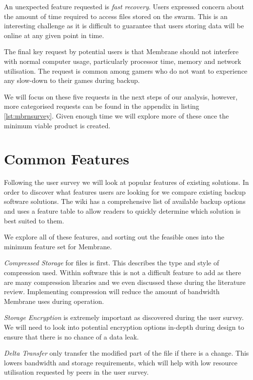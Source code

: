 \documentclass[11pt, a4paper, twoside]{report}
\begin{document}
An unexpected feature requested is \emph{fast recovery}. Users expressed concern about the amount of time required to access files stored on the swarm. This is an interesting challenge as it is difficult to guarantee that users storing data will be online at any given point in time.

The final key request by potential users is that Membrane should not interfere with normal computer usage, particularly processor time, memory and network utilisation. The request is common among gamers who do not want to experience any slow-down to their games during backup.

We will focus on these five requests in the next steps of our analysis, however, more categorised requests can be found in the appendix in listing \ref{lst:mbrnsurvey}. Given enough time we will explore more of these once the minimum viable product is created.

\section{Common Features} \label{sec:commonfeatures}

Following the user survey we will look at popular features of existing solutions. In order to discover what features users are looking for we compare existing backup software solutions. The \cite{arch2017syncandbackup} wiki has a comprehensive list of available backup options and uses a feature table to allow readers to quickly determine which solution is best suited to them.

We explore all of these features, and sorting out the feasible ones into the minimum feature set for Membrane.

\emph{Compressed Storage} for files is first. This describes the type and style of compression used. Within software this is not a difficult feature to add as there are many compression libraries and we even discussed these during the literature review. Implementing compression will reduce the amount of bandwidth Membrane uses during operation.

\emph{Storage Encryption} is extremely important as discovered during the user survey. We will need to look into potential encryption options in-depth during design to ensure that there is no chance of a data leak.

\emph{Delta Transfer} only transfer the modified part of the file if there is a change. This lowers bandwidth and storage requirements, which will help with low resource utilisation requested by peers in the user survey.
\end{document}
